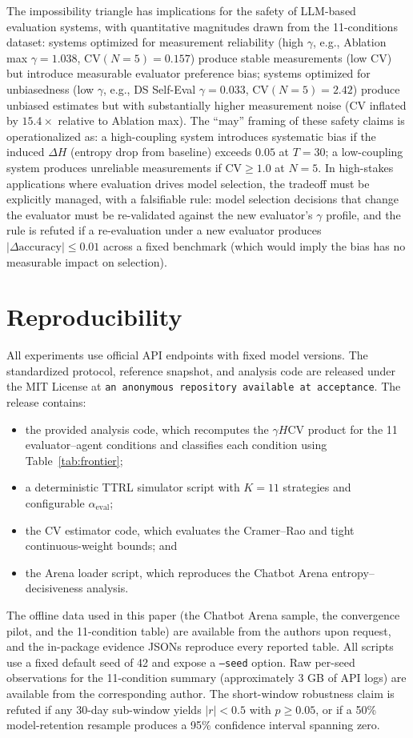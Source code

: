 \documentclass[11pt]{article}
\begin{document}
The impossibility triangle has implications for the safety of LLM-based evaluation systems, with quantitative magnitudes drawn from the 11-conditions dataset: systems optimized for measurement reliability (high $\gamma$, e.g., Ablation max $\gamma = 1.038$, $\mathrm{CV}(N{=}5) = 0.157$) produce stable measurements (low $\mathrm{CV}$) but introduce measurable evaluator preference bias; systems optimized for unbiasedness (low $\gamma$, e.g., DS Self-Eval $\gamma = 0.033$, $\mathrm{CV}(N{=}5) = 2.42$) produce unbiased estimates but with substantially higher measurement noise (CV inflated by $15.4\times$ relative to Ablation max). The ``may'' framing of these safety claims is operationalized as: a high-coupling system introduces systematic bias if the induced $\Delta H$ (entropy drop from baseline) exceeds $0.05$ at $T{=}30$; a low-coupling system produces unreliable measurements if $\mathrm{CV} \geq 1.0$ at $N{=}5$. In high-stakes applications where evaluation drives model selection, the tradeoff must be explicitly managed, with a falsifiable rule: model selection decisions that change the evaluator must be re-validated against the new evaluator's $\gamma$ profile, and the rule is refuted if a re-evaluation under a new evaluator produces $|\Delta\text{accuracy}| \leq 0.01$ across a fixed benchmark (which would imply the bias has no measurable impact on selection).

\section*{Reproducibility}

All experiments use official API endpoints with fixed model versions. The standardized protocol, reference snapshot, and analysis code are released under the MIT License at \texttt{an anonymous repository available at acceptance}. The release contains:
\begin{itemize}[leftmargin=*,nosep]
  \item the provided analysis code, which recomputes the $\gamma H\mathrm{CV}$ product for the 11 evaluator--agent conditions and classifies each condition using Table~\ref{tab:frontier};
  \item a deterministic TTRL simulator script with $K{=}11$ strategies and configurable $\alpha_{\text{eval}}$;
  \item the CV estimator code, which evaluates the Cramer--Rao and tight continuous-weight bounds; and
  \item the Arena loader script, which reproduces the Chatbot Arena entropy--decisiveness analysis.
\end{itemize}
The offline data used in this paper (the Chatbot Arena sample, the convergence pilot, and the 11-condition table) are available from the authors upon request, and the in-package evidence JSONs reproduce every reported table. All scripts use a fixed default seed of 42 and expose a \texttt{--seed} option. Raw per-seed observations for the 11-condition summary (approximately 3 GB of API logs) are available from the corresponding author. The short-window robustness claim is refuted if any 30-day sub-window yields $|r| < 0.5$ with $p \geq 0.05$, or if a 50\% model-retention resample produces a 95\% confidence interval spanning zero.
\end{document}
